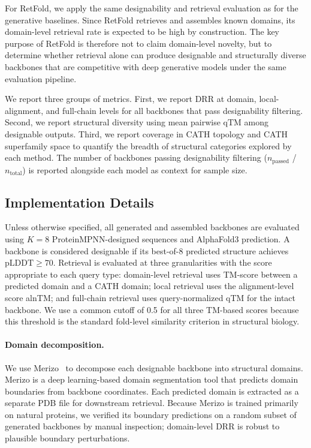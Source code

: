 \documentclass[letterpaper]{article} %
\begin{document}
For RetFold, we apply the same designability and retrieval evaluation as for the generative baselines. Since RetFold retrieves and assembles known domains, its domain-level retrieval rate is expected to be high by construction. The key purpose of RetFold is therefore not to claim domain-level novelty, but to determine whether retrieval alone can produce designable and structurally diverse backbones that are competitive with deep generative models under the same evaluation pipeline.

We report three groups of metrics. First, we report DRR at domain, local-alignment, and full-chain levels for all backbones that pass designability filtering. Second, we report structural diversity using mean pairwise $\mathrm{qTM}$ among designable outputs. Third, we report coverage in CATH topology and CATH superfamily space to quantify the breadth of structural categories explored by each method. The number of backbones passing designability filtering ($n_\mathrm{passed}$ / $n_\mathrm{total}$) is reported alongside each model as context for sample size.

\subsection{Implementation Details}

Unless otherwise specified, all generated and assembled backbones are evaluated using $K=8$ ProteinMPNN-designed sequences and AlphaFold3 prediction. A backbone is considered designable if its best-of-$8$ predicted structure achieves $\mathrm{pLDDT} \geq 70$. Retrieval is evaluated at three granularities with the score appropriate to each query type: domain-level retrieval uses TM-score between a predicted domain and a CATH domain; local retrieval uses the alignment-level score alnTM; and full-chain retrieval uses query-normalized qTM for the intact backbone. We use a common cutoff of 0.5 for all three TM-based scores because this threshold is the standard fold-level similarity criterion in structural biology.

\paragraph{Domain decomposition.} We use Merizo~\cite{merizo} to decompose each designable backbone into structural domains. Merizo is a deep learning-based domain segmentation tool that predicts domain boundaries from backbone coordinates. Each predicted domain is extracted as a separate PDB file for downstream retrieval. Because Merizo is trained primarily on natural proteins, we verified its boundary predictions on a random subset of generated backbones by manual inspection; domain-level DRR is robust to plausible boundary perturbations.
\end{document}

